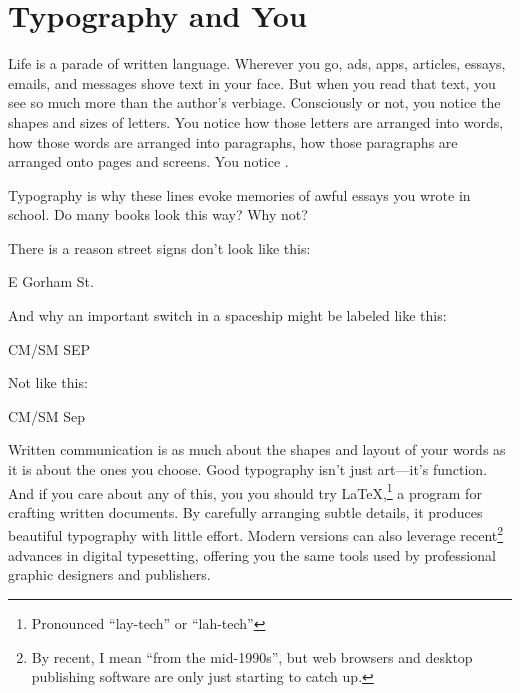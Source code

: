 \chapter{Typography and You}
\label{typography}

Life is a parade of written language.
Wherever you go,
ads, apps, articles, essays, emails, and messages
shove text in your face.
But when you read that text, you see so much more than the author's
verbiage.
Consciously or not, you notice the shapes and sizes of letters.
You notice how those letters are arranged into words,
how those words are arranged into paragraphs,
how those paragraphs are arranged onto pages and screens.
You notice .
\begin{leftfigure}
\fontsize{12bp}{24bp}\selectfont\raggedright
Typography is why these lines evoke memories of awful essays
you wrote in school.
Do many books look this way? Why not?
\end{leftfigure}
\medskip
\noindent There is a reason street signs don't look like this:
\begin{leftfigure}
\Large E Gorham St.
\end{leftfigure}
And why an important switch in a spaceship might be labeled like this:
\begin{leftfigure}
CM/SM SEP
\end{leftfigure}
Not like this:
\begin{leftfigure}
\Large CM/SM Sep
\end{leftfigure}

Written communication is as much about the shapes and layout of your words
as it is about the ones you choose.
Good typography isn't just art---it's function.
And if you care about any of this,
you you should try \LaTeX,\punckern\footnote{Pronounced ``lay-tech''
or ``lah-tech''}
a program for crafting written documents.
By carefully arranging subtle details,
it produces beautiful typography with little effort.
Modern versions can also leverage recent\footnote{By recent,
I mean ``from the mid-1990s''\quotekern, but web browsers and desktop publishing
software are only just starting to catch up.} advances in digital typesetting,
offering you the same tools used by professional graphic designers and
publishers.

